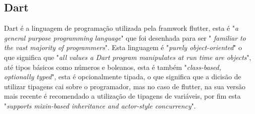\subsection{Dart}
Dart é a linguagem de programação utilizada pela framwork flutter, esta é "\emph{a general purpose programming language}"\citep{dart_pg_lang} que foi desenhada para ser "\emph{  familiar  to  the  vast  majority  of  programmers}"\citep{dart_pg_lang}. Esta linguagem é "\emph{purely  object-oriented}" o que significa que "\emph{all values a Dart program manipulates at run time are objects}"\citep{dart_pg_lang}, até tipos básicos como números e boleanos, esta é também  "\emph{class-based,  optionally  typed}", esta é opcionalmente tipada, o que significa que a dicisão de utilizar tipagens cai sobre o programador, mas no caso de flutter, na sua versão mais recente é recomendado a utilização de tipagens de variáveis, por fim esta "\emph{supports  mixin-based inheritance and actor-style concurrency}"\citep{dart_pg_lang}.